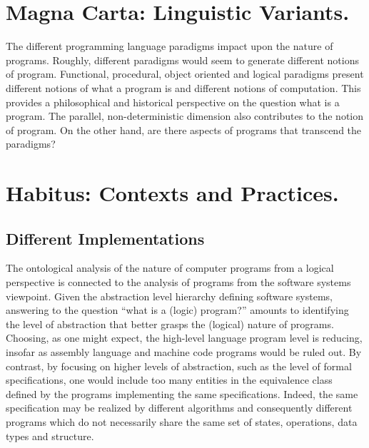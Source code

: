 \documentclass[]{article}
\begin{document}
{\color{red}{Tomas?}}



\section{Magna Carta: Linguistic Variants.}

{\color{red}{Ray's note}}

The different programming language paradigms impact upon the nature of programs. Roughly, different paradigms would seem to generate different notions of program. Functional, procedural, object oriented and logical paradigms present different notions of what a program is and different notions of computation. This provides a philosophical and historical perspective on the question what is a program. The parallel, non-deterministic dimension also contributes to the notion of program. On the other hand, are there aspects of programs that transcend the paradigms? 



\section{Habitus: Contexts and Practices.}


\subsection{Different Implementations}

{\color{red}{GP?}}

The ontological analysis of the nature of computer programs from a logical perspective is connected to the analysis of programs from the software systems viewpoint. Given the abstraction level hierarchy defining software systems, answering to the question “what is a (logic) program?” amounts to identifying the level of abstraction that better grasps the (logical) nature of programs. Choosing, as one might expect,
the high-level language program level is reducing, insofar as assembly language and machine
code programs would be ruled out. By contrast, by focusing on higher levels of abstraction, such
as the level of formal specifications, one would include too many entities in the equivalence
class defined by the programs implementing the same specifications. Indeed, the same
specification may be realized by different algorithms and consequently different programs which
do not necessarily share the same set of states, operations, data types and structure.
\end{document}
